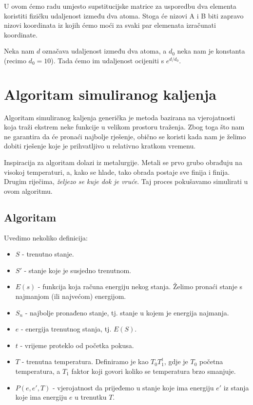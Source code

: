 \documentclass[times, utf8, zavrsni]{fer}
\begin{document}
U ovom ćemo radu umjesto supstitucijske matrice za usporedbu dva elementa
koristiti fizičku udaljenost između dva atoma. Stoga će nizovi A i B biti
zapravo nizovi koordinata iz kojih ćemo moći za svaki par elemenata
izračunati koordinate. 

Neka nam $d$ označava udaljenost između dva atoma, a $d_0$ neka nam
je konstanta (recimo $d_0 = 10$). Tada ćemo im udaljenost ocijeniti s
$e^{d/d_0}$. 


\chapter{Algoritam simuliranog kaljenja}
Algoritam simuliranog kaljenja generička je metoda bazirana na vjerojatnosti koja
traži ekstrem neke funkcije u velikom prostoru traženja. Zbog toga što nam ne
garantira da će pronaći najbolje rješenje, obično se koristi kada nam je
želimo dobiti rješenje koje je prihvatljivo u relativno kratkom
vremenu.

Inspiracija za algoritam dolazi iz metalurgije. Metali se prvo grubo obrađuju
na visokoj temperaturi, a, kako se hlade, tako obrada postaje sve finija
i  finija. Drugim riječima, \textit{željezo se kuje dok je vruće}. 
Taj proces pokušavamo simulirati u ovom algoritmu.

\section{Algoritam}
Uvedimo nekoliko definicija:
\begin{itemize}
\item $S$ - trenutno stanje.

\item $S'$ - stanje koje je susjedno trenutnom.

\item $E(s)$ - funkcija koja računa energiju nekog stanja. Želimo pronaći
stanje s najmanjom (ili najvećom) energijom. 

\item $S_{n}$ - najbolje pronađeno stanje, tj. stanje u kojem je 
energija najmanja.

\item $e$ - energija trenutnog stanja, tj. $E(S)$.

\item $t$ - vrijeme proteklo od početka pokusa. 

\item $T$ - trenutna temperatura. Definiramo je kao $T_0 T_1^{t}$, gdje je
$T_0$ početna temperatura, a $T_1$ faktor koji govori koliko se temperatura
brzo smanjuje. 

\item $P(e, e', T)$ - vjerojatnost da prijeđemo u stanje koje ima energiju
$e'$ iz stanja koje ima energiju $e$ u trenutku $T$. 
\end{itemize}
\end{document}
